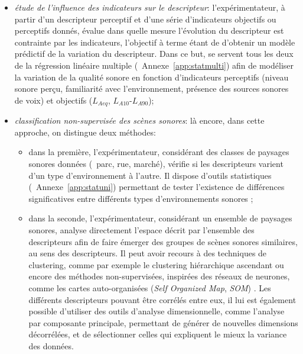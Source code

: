\begin{itemize}
\item \emph{étude de l'influence des indicateurs sur le descripteur}: l'expérimentateur, à partir d'un descripteur perceptif et d'une série d'indicateurs objectifs ou perceptifs donnés, évalue dans quelle mesure l'évolution du descripteur est contrainte par les indicateurs, l'objectif à terme étant de d'obtenir un modèle prédictif de la variation du descripteur. Dans ce but, \citep{lavandier2006contribution,ricciardi2015sound} se servent tous les deux de la régression linéaire multiple (\cf~Annexe~\ref{app:statmulti}) afin de modéliser la variation de la qualité sonore en fonction d'indicateurs perceptifs (niveau sonore perçu, familiarité avec l'environnement, présence des sources sonores de voix) et objectifs ($L_{Aeq}$, $L_{A10}$-$L_{A90}$);

\item \emph{classification non-supervisée des scènes sonores}: là encore, dans cette approche, on distingue deux méthodes:

\begin{itemize}
\item dans la première, l'expérimentateur, considérant des classes de paysages sonores données (\eg~parc, rue, marché), vérifie si les descripteurs varient d'un type d'environnement à l'autre. Il dispose d'outils statistiques (\cf~Annexe~\ref{app:statuni}) permettant de tester l'existence de différences significatives entre différents types d'environnements sonores \citep{hong2013designing};
\item dans la seconde, l'expérimentateur, considérant un ensemble de paysages sonores, analyse directement l'espace décrit par l'ensemble des descripteurs afin de faire émerger des groupes de scènes sonores similaires, au sens des descripteurs. Il peut avoir recours à des techniques de clustering, comme par exemple le clustering hiérarchique ascendant \citep{torija2013application} ou encore des méthodes non-supervisées, inspirées des réseaux de neurones, comme les cartes auto-organisées (\emph{Self Organized Map}, \emph{SOM}) \citep{ricciardi2015sound}. Les différents descripteurs pouvant être corrélés entre eux, il lui est également possible d'utiliser des outils d'analyse dimensionnelle, comme l'analyse par composante principale, permettant de générer de nouvelles dimensions décorrélées, et de sélectionner celles qui expliquent le mieux la variance des données.
\end{itemize}

\end{itemize}

